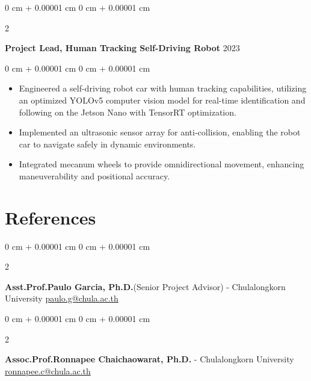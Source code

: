 \documentclass[10pt, letterpaper]{article}
\newenvironment{highlights}{
    \begin{itemize}[
        topsep=0.0 cm,
        parsep=0.0 cm,
        partopsep=0pt,
        itemsep=0pt,
        leftmargin=0 cm + 10pt
    ]
}{
    \end{itemize}
} %
\newenvironment{onecolentry}{
    \begin{adjustwidth}{
        0 cm + 0.00001 cm
    }{
        0 cm + 0.00001 cm
    }
}{
    \end{adjustwidth}
} %
\newenvironment{twocolentry}[2][]{
    \onecolentry
    \def\secondColumn{#2}
    \setcolumnwidth{\fill, 4.5 cm}
    \begin{paracol}{2}
}{
    \switchcolumn \raggedleft \secondColumn
    \end{paracol}
    \endonecolentry
} %
\begin{document}
        \vspace{0.30 cm}
        \begin{twocolentry}{
        }
            \textbf{Project Lead, Human Tracking Self-Driving Robot} 2023\end{twocolentry}

        \vspace{0.10 cm}
        \begin{onecolentry}
            \begin{highlights}
                \item Engineered a self-driving robot car with human tracking capabilities, utilizing an optimized YOLOv5 computer vision model for real-time identification and following on the Jetson Nano with TensorRT optimization.
                \item Implemented an ultrasonic sensor array for anti-collision, enabling the robot car to navigate safely in dynamic environments.
                \item Integrated mecanum wheels to provide omnidirectional movement, enhancing maneuverability and positional accuracy.
            \end{highlights}
        \end{onecolentry}

            
    \section{References}
        \begin{twocolentry}{
            \href{paulo.g@chula.ac.th}{paulo.g@chula.ac.th}
        }
            \textbf{Asst.Prof.Paulo Garcia, Ph.D.}(Senior Project Advisor) - Chulalongkorn University\end{twocolentry}

        \vspace{0.30 cm}

        \begin{twocolentry}{
            \href{ronnapee.c@chula.ac.th}{ronnapee.c@chula.ac.th}
        }
            \textbf{Assoc.Prof.Ronnapee Chaichaowarat, Ph.D.} - Chulalongkorn University\end{twocolentry}
\end{document}
